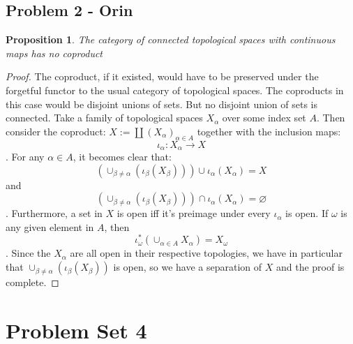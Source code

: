 \documentclass{article}
\newtheorem{proposition}[subsection]{Proposition}
\begin{document}
\subsection{Problem 2 - Orin}
\begin{proposition}
	The category of connected topological spaces with continuous maps has no coproduct
\end{proposition}
\begin{proof}
	The coproduct, if it existed, would have to be preserved under the forgetful functor to the usual category of topological spaces.  The coproducts in this case would be disjoint unions of sets.  But no disjoint union of sets is connected.  Take a family of topological spaces $X_\alpha$ over some index set $A$.  Then consider the coproduct: $X := \coprod(X_\alpha)_{\alpha\in A}$ together with the inclusion maps: $$\iota_\alpha: X_\alpha\to X$$.  For any $\alpha\in A$, it becomes clear that:
	$$(\cup_{\beta\neq\alpha}(\iota_\beta(X_\beta)))\cup \iota_\alpha(X_\alpha) = X$$ and
	$$(\cup_{\beta\neq\alpha}(\iota_\beta(X_\beta)))\cap \iota_\alpha(X_\alpha) = \varnothing$$.  Furthermore, a set in $X$ is open iff it's preimage under every $\iota_\alpha$ is open.  If $\omega$ is any given element in $A$, then
	$$\iota_\omega^*(\cup_{\alpha\in A}X_\alpha)=X_\omega$$. Since the $X_\alpha$ are all open in their respective topologies, we have in particular that $\cup_{\beta\neq\alpha}(\iota_\beta(X_\beta))$ is open, so we have a separation of $X$ and the proof is complete.
\end{proof}
\section{Problem Set 4}
\end{document}

